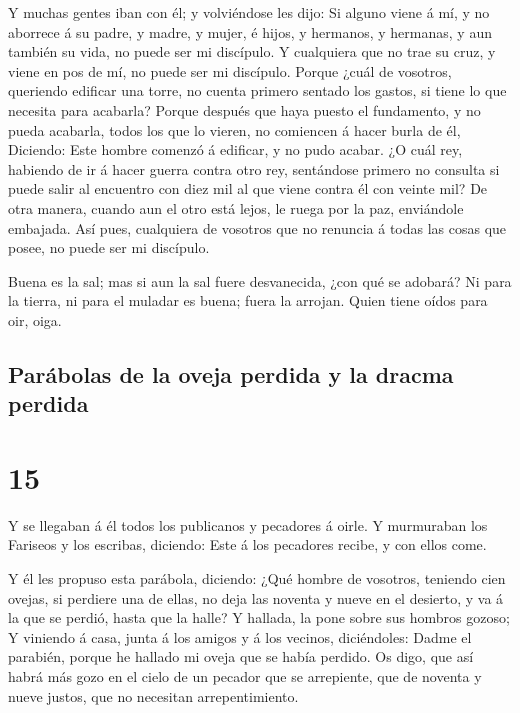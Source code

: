  Y muchas gentes iban con él; y volviéndose les dijo:
 Si alguno viene á mí, y no aborrece á su padre, y madre,
y mujer, é hijos, y hermanos, y hermanas, y aun también su vida, no
puede ser mi discípulo.  Y cualquiera que no trae su
cruz, y viene en pos de mí, no puede ser mi discípulo. 
Porque ¿cuál de vosotros, queriendo edificar una torre, no cuenta
primero sentado los gastos, si tiene lo que necesita para acabarla?
 Porque después que haya puesto el fundamento, y no pueda
acabarla, todos los que lo vieren, no comiencen á hacer burla de él,
 Diciendo: Este hombre comenzó á edificar, y no pudo
acabar.  ¿O cuál rey, habiendo de ir á hacer guerra
contra otro rey, sentándose primero no consulta si puede salir al
encuentro con diez mil al que viene contra él con veinte mil?
 De otra manera, cuando aun el otro está lejos, le ruega
por la paz, enviándole embajada.  Así pues, cualquiera de
vosotros que no renuncia á todas las cosas que posee, no puede ser mi
discípulo.

 Buena es la sal; mas si aun la sal fuere desvanecida,
¿con qué se adobará?  Ni para la tierra, ni para el
muladar es buena; fuera la arrojan. Quien tiene oídos para oir, oiga.

\hypertarget{paruxe1bolas-de-la-oveja-perdida-y-la-dracma-perdida}{%
\subsection{Parábolas de la oveja perdida y la dracma
perdida}\label{paruxe1bolas-de-la-oveja-perdida-y-la-dracma-perdida}}

\hypertarget{section-14}{%
\section{15}\label{section-14}}

 Y se llegaban á él todos los publicanos y pecadores á
oirle.  Y murmuraban los Fariseos y los escribas,
diciendo: Este á los pecadores recibe, y con ellos come.

 Y él les propuso esta parábola, diciendo: 
¿Qué hombre de vosotros, teniendo cien ovejas, si perdiere una de ellas,
no deja las noventa y nueve en el desierto, y va á la que se perdió,
hasta que la halle?  Y hallada, la pone sobre sus hombros
gozoso;  Y viniendo á casa, junta á los amigos y á los
vecinos, diciéndoles: Dadme el parabién, porque he hallado mi oveja que
se había perdido.  Os digo, que así habrá más gozo en el
cielo de un pecador que se arrepiente, que de noventa y nueve justos,
que no necesitan arrepentimiento.

